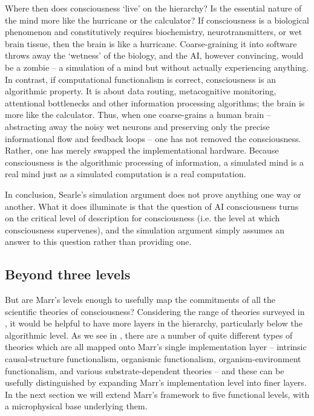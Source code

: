\documentclass[11pt, a4paper, onecolumn, gdm]{google}
\begin{document}
Where then does consciousness `live' on the hierarchy?
Is the essential nature of the mind more like the hurricane or the calculator?
If consciousness is a biological phenomenon and constitutively requires biochemistry, neurotransmitters, or wet brain tissue, then the brain is like a hurricane.
Coarse-graining it into software throws away the `wetness' of the biology, and the AI, however convincing, would be a zombie -- a simulation of a mind but without actually experiencing anything.
In contrast, if computational functionalism is correct, consciousness is an algorithmic property.
It is about data routing, metacognitive monitoring, attentional bottlenecks and other information processing algorithms; the brain is more like the calculator.
Thus, when one coarse-grains a human brain -- abstracting away the noisy wet neurons and preserving only the precise informational flow and feedback loops -- one has not removed the consciousness.
Rather, one has merely swapped the implementational hardware.
Because consciousness is the algorithmic processing of information, a simulated mind is a real mind just as a simulated computation is a real computation.

In conclusion, Searle's simulation argument does not prove anything one way or another.
What it does illuminate is that the question of AI consciousness turns on the critical level of description for consciousness (i.e. the level at which consciousness supervenes), and the simulation argument simply assumes an answer to this question rather than providing one.

\subsection{Beyond three levels}\label{beyond-three-levels}

But are Marr's levels enough to usefully map the commitments of all the scientific theories of consciousness?
Considering the range of theories surveyed in , it would be helpful to have more layers in the hierarchy, particularly below the algorithmic level.
As we see in , there are a number of quite different types of theories which are all mapped onto Marr's single implementation layer -- intrinsic causal-structure functionalism, organismic functionalism, organism-environment functionalism, and various substrate-dependent theories -- and these can be usefully distinguished by expanding Marr's implementation level into finer layers.
In the next section we will extend Marr's framework to five functional levels, with a microphysical base underlying them.
\end{document}
